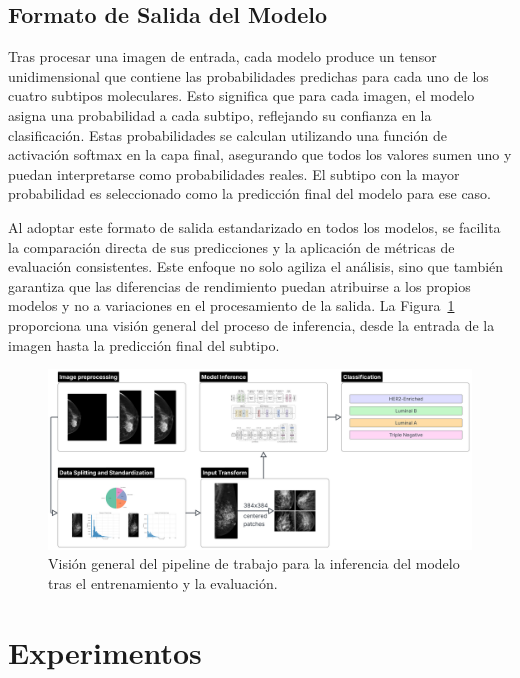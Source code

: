 \documentclass[a4paper,10pt]{book}
\begin{document}
\subsection{Formato de Salida del Modelo}

Tras procesar una imagen de entrada, cada modelo produce un tensor unidimensional que contiene las probabilidades predichas para cada uno de los cuatro subtipos moleculares. Esto significa que para cada imagen, el modelo asigna una probabilidad a cada subtipo, reflejando su confianza en la clasificación. Estas probabilidades se calculan utilizando una función de activación softmax en la capa final, asegurando que todos los valores sumen uno y puedan interpretarse como probabilidades reales. El subtipo con la mayor probabilidad es seleccionado como la predicción final del modelo para ese caso.

Al adoptar este formato de salida estandarizado en todos los modelos, se facilita la comparación directa de sus predicciones y la aplicación de métricas de evaluación consistentes. Este enfoque no solo agiliza el análisis, sino que también garantiza que las diferencias de rendimiento puedan atribuirse a los propios modelos y no a variaciones en el procesamiento de la salida. La Figura~\ref{fig:flowchart} proporciona una visión general del proceso de inferencia, desde la entrada de la imagen hasta la predicción final del subtipo.

\begin{figure}[h!]
    \centering
    \includegraphics[width=0.9\linewidth]{reports//assets/Flowchart.png}
   \caption[Pipeline de trabajo]{Visión general del pipeline de trabajo para la inferencia del modelo tras el entrenamiento y la evaluación.}
    \label{fig:flowchart}
\end{figure}

\section{Experimentos}
\end{document}
